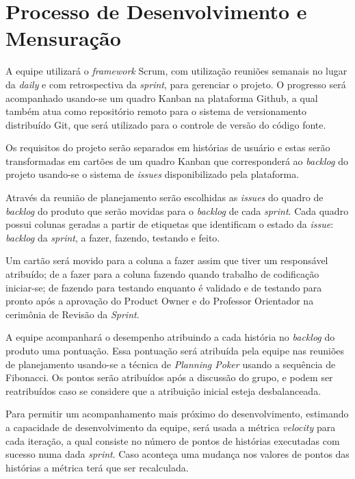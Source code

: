 \documentclass[
	12pt,				%
	oneside,			%
	a4paper,			%
	english,			%
	brazil,				%
	]{abntex2}
\begin{document}
\section{Processo de Desenvolvimento e Mensuração}
A equipe utilizará o \textit{framework} Scrum, com utilização reuniões semanais no lugar da \textit{daily} e com retrospectiva da \textit{sprint}, para gerenciar o projeto. O progresso será acompanhado usando-se um quadro Kanban na plataforma Github, a qual também atua como repositório remoto para o sistema de versionamento distribuído Git, que será utilizado para o controle de versão do código fonte.

Os requisitos do projeto serão separados em histórias de usuário e estas serão transformadas em cartões de um quadro Kanban que corresponderá ao \textit{backlog} do projeto usando-se o sistema de \textit{issues} disponibilizado pela plataforma.

Através da reunião de planejamento serão escolhidas as \textit{issues} do quadro de \textit{backlog} do produto que serão movidas para o \textit{backlog} de cada \textit{sprint}. Cada quadro possui colunas geradas a partir de etiquetas que identificam o estado da \textit{issue}: \textit{backlog} da \textit{sprint}, a fazer, fazendo, testando e feito.

Um cartão será movido para a coluna a fazer assim que tiver um responsável atribuído; de a fazer para a coluna fazendo quando trabalho de codificação iniciar-se; de fazendo para testando enquanto é validado e de testando para pronto após a aprovação do Product Owner e do Professor Orientador na cerimônia de Revisão da \textit{Sprint}.

A equipe acompanhará o desempenho atribuindo a cada história no \textit{backlog} do produto uma pontuação. Essa pontuação será atribuída pela equipe nas reuniões de planejamento usando-se a técnica de \textit{Planning Poker} \cite{planning_poker} usando a sequência de Fibonacci. Os pontos serão atribuídos após a discussão do grupo, e podem ser reatribuídos caso se considere que a atribuição inicial esteja desbalanceada.

Para permitir um acompanhamento mais próximo do desenvolvimento, estimando a capacidade de desenvolvimento da equipe, será usada a métrica \textit{velocity} para cada iteração, a qual consiste no número de pontos de histórias executadas com sucesso numa dada \textit{sprint}. Caso aconteça uma mudança nos valores de pontos das histórias a métrica terá que ser recalculada.
\end{document}
